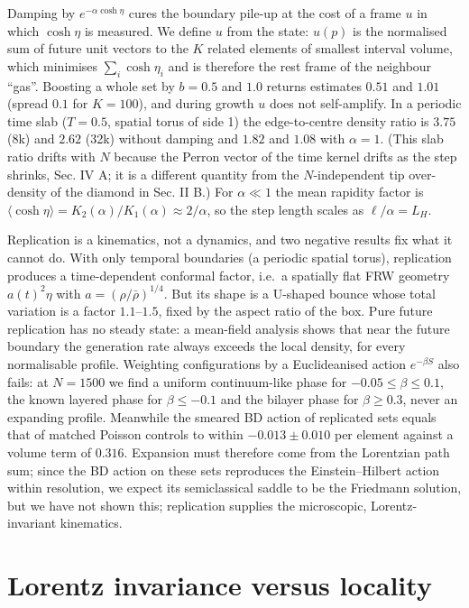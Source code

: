 Damping by \(e^{-\alpha\cosh\eta}\) cures the boundary
pile-up at the cost of a frame \(u\) in which \(\cosh\eta\)
is measured. We define \(u\) from the state: \(u(p)\) is the
normalised sum of future unit vectors to the \(K\) related
elements of smallest interval volume, which minimises
\(\sum_i\cosh\eta_i\) and is therefore the rest frame of the
neighbour ``gas''. Boosting a whole set by \(b=0.5\) and
\(1.0\) returns estimates \(0.51\) and \(1.01\) (spread
\(0.1\) for \(K=100\)), and during growth \(u\) does not
self-amplify. In a periodic time slab (\(T=0.5\), spatial
torus of side 1) the edge-to-centre density ratio is
\(3.75\) (8k) and \(2.62\) (32k) without damping and
\(1.82\) and \(1.08\) with \(\alpha=1\). (This slab ratio
drifts with \(N\) because the Perron vector of the time
kernel drifts as the step shrinks, Sec. IV A; it is a
different quantity from the \(N\)-independent tip
over-density of the diamond in Sec. II B.) For
\(\alpha\ll1\) the mean rapidity factor is
\(\langle\cosh\eta\rangle=K_2(\alpha)/K_1(\alpha)\approx2/\alpha\),
so the step length scales as \(\ell/\alpha=L_H\).

Replication is a kinematics, not a dynamics, and two
negative results fix what it cannot do. With only temporal
boundaries (a periodic spatial torus), replication produces
a time-dependent conformal factor, i.e.~a spatially flat FRW
geometry \(a(t)^2\eta\) with \(a=(\rho/\bar\rho)^{1/4}\).
But its shape is a U-shaped bounce whose total variation is
a factor \(1.1\)--\(1.5\), fixed by the aspect ratio of the
box. Pure future replication has no steady state: a
mean-field analysis shows that near the future boundary the
generation rate always exceeds the local density, for every
normalisable profile. Weighting configurations by a
Euclideanised action \(e^{-\beta S}\) also fails: at
\(N=1500\) we find a uniform continuum-like phase for
\(-0.05\le\beta\le0.1\), the known layered phase for
\(\beta\le-0.1\) and the bilayer phase for \(\beta\ge0.3\),
never an expanding profile. Meanwhile the smeared BD action
of replicated sets equals that of matched Poisson controls
to within \(-0.013\pm0.010\) per element against a volume
term of \(0.316\). Expansion must therefore come from the
Lorentzian path sum; since the BD action on these sets
reproduces the Einstein--Hilbert action within resolution,
we expect its semiclassical saddle to be the Friedmann
solution, but we have not shown this; replication supplies
the microscopic, Lorentz-invariant kinematics.

\hypertarget{lorentz-invariance-versus-locality}{%
\section{Lorentz invariance versus
locality}\label{lorentz-invariance-versus-locality}}


